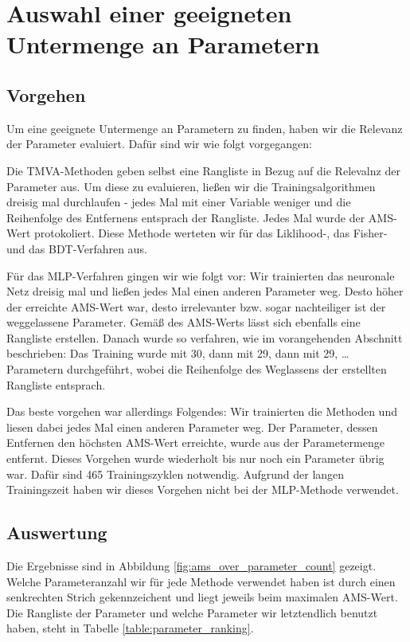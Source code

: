 \section{Auswahl einer geeigneten Untermenge an Parametern}

\subsection{Vorgehen}
Um eine geeignete Untermenge an Parametern zu finden, haben wir die Relevanz der
Parameter evaluiert. Dafür sind wir wie folgt vorgegangen:

Die TMVA-Methoden geben selbst eine Rangliste in Bezug auf die Relevalnz der
Parameter aus. Um diese zu evaluieren, ließen wir die Trainingsalgorithmen
dreisig mal durchlaufen - jedes Mal mit einer Variable weniger und die
Reihenfolge des Entfernens entsprach der Rangliste. Jedes Mal wurde der AMS-Wert
protokoliert. Diese Methode werteten wir für das Liklihood-, das Fisher- und das
BDT-Verfahren aus.

Für das MLP-Verfahren gingen wir wie folgt vor: Wir trainierten das neuronale
Netz dreisig mal und ließen jedes Mal einen anderen Parameter weg. Desto höher
der erreichte AMS-Wert war, desto irrelevanter bzw. sogar nachteiliger ist der
weggelassene Parameter. Gemäß des AMS-Werts lässt sich ebenfalls eine Rangliste
erstellen. Danach wurde so verfahren, wie im vorangehenden Abschnitt
beschrieben: Das Training wurde mit 30, dann mit 29, dann mit 29, \ldots
Parametern durchgeführt, wobei die Reihenfolge des Weglassens der erstellten
Rangliste entsprach.

Das beste vorgehen war allerdings Folgendes: Wir trainierten die Methoden
und liesen dabei jedes Mal einen anderen Parameter weg. Der Parameter, dessen
Entfernen den höchsten AMS-Wert erreichte, wurde aus der Parametermenge
entfernt.
Dieses Vorgehen wurde wiederholt bis nur noch ein Parameter übrig war. Dafür
sind 465 Trainingszyklen notwendig. Aufgrund der langen Trainingszeit
haben wir dieses Vorgehen nicht bei der MLP-Methode verwendet.


\subsection{Auswertung}

Die Ergebnisse sind in Abbildung \ref{fig:ams_over_parameter_count} gezeigt.
Welche Parameteranzahl wir für jede Methode verwendet haben ist durch einen
senkrechten Strich gekennzeichent und liegt jeweils beim maximalen AMS-Wert.
Die Rangliste der Parameter und welche Parameter wir letztendlich benutzt haben,
steht in Tabelle \ref{table:parameter_ranking}.

